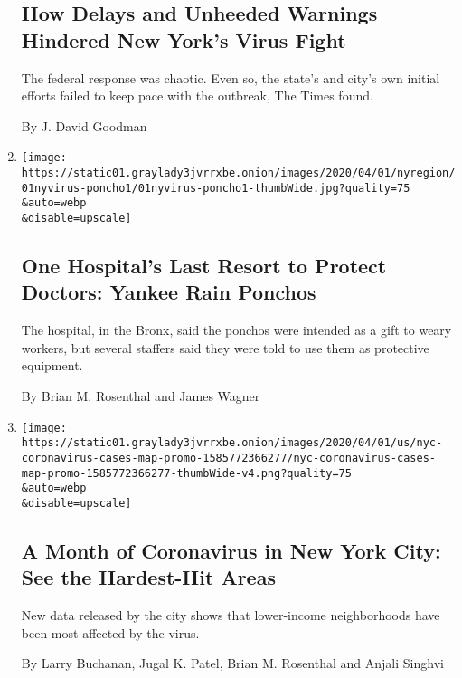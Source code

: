 \begin{enumerate}
  \hypertarget{how-delays-and-unheeded-warnings-hindered-new-yorks-virus-fight}{%
  \subsection{How Delays and Unheeded Warnings Hindered New York's Virus
  Fight}\label{how-delays-and-unheeded-warnings-hindered-new-yorks-virus-fight}}

  The federal response was chaotic. Even so, the state's and city's own
  initial efforts failed to keep pace with the outbreak, The Times
  found.

  By J. David Goodman
\item
  \href{/2020/04/02/nyregion/coronavirus-yankees-ponchos.html}{}

  \texttt{[image: https://static01.graylady3jvrrxbe.onion/images/2020/04/01/nyregion/01nyvirus-poncho1/01nyvirus-poncho1-thumbWide.jpg?quality=75\\\&auto=webp\\\&disable=upscale]}

  \hypertarget{one-hospitals-last-resort-to-protect-doctors-yankee-rain-ponchos}{%
  \subsection{One Hospital's Last Resort to Protect Doctors: Yankee Rain
  Ponchos}\label{one-hospitals-last-resort-to-protect-doctors-yankee-rain-ponchos}}

  The hospital, in the Bronx, said the ponchos were intended as a gift
  to weary workers, but several staffers said they were told to use them
  as protective equipment.

  By Brian M. Rosenthal and James Wagner
\item
  \href{/interactive/2020/04/01/nyregion/nyc-coronavirus-cases-map.html}{}

  \texttt{[image: https://static01.graylady3jvrrxbe.onion/images/2020/04/01/us/nyc-coronavirus-cases-map-promo-1585772366277/nyc-coronavirus-cases-map-promo-1585772366277-thumbWide-v4.png?quality=75\\\&auto=webp\\\&disable=upscale]}

  \hypertarget{a-month-of-coronavirus-in-new-york-city-see-the-hardest-hit-areas}{%
  \subsection{A Month of Coronavirus in New York City: See the
  Hardest-Hit
  Areas}\label{a-month-of-coronavirus-in-new-york-city-see-the-hardest-hit-areas}}

  New data released by the city shows that lower-income neighborhoods
  have been most affected by the virus.

  By Larry Buchanan, Jugal K. Patel, Brian M. Rosenthal and Anjali
  Singhvi
\end{enumerate}

